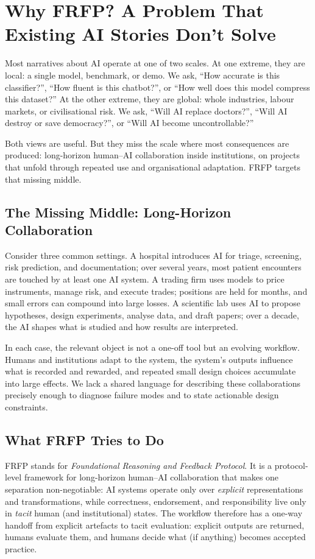 \chapter{Why FRFP? A Problem That Existing AI Stories Don't Solve}
\label{ch:plain-why-frfp}
Most narratives about AI operate at one of two scales. At one extreme, they are local: a single model, benchmark, or demo. We ask, ``How accurate is this classifier?'', ``How fluent is this chatbot?'', or ``How well does this model compress this dataset?'' At the other extreme, they are global: whole industries, labour markets, or civilisational risk. We ask, ``Will AI replace doctors?'', ``Will AI destroy or save democracy?'', or ``Will AI become uncontrollable?''

Both views are useful. But they miss the scale where most consequences are produced: long-horizon human--AI collaboration inside institutions, on projects that unfold through repeated use and organisational adaptation. FRFP targets that missing middle.

\section{The Missing Middle: Long-Horizon Collaboration}

Consider three common settings. A hospital introduces AI for triage, screening, risk prediction, and documentation; over several years, most patient encounters are touched by at least one AI system. A trading firm uses models to price instruments, manage risk, and execute trades; positions are held for months, and small errors can compound into large losses. A scientific lab uses AI to propose hypotheses, design experiments, analyse data, and draft papers; over a decade, the AI shapes what is studied and how results are interpreted.

In each case, the relevant object is not a one-off tool but an evolving workflow. Humans and institutions adapt to the system, the system’s outputs influence what is recorded and rewarded, and repeated small design choices accumulate into large effects. We lack a shared language for describing these collaborations precisely enough to diagnose failure modes and to state actionable design constraints.

\section{What FRFP Tries to Do}

FRFP stands for \emph{Foundational Reasoning and Feedback Protocol}. It is a protocol-level framework for long-horizon human--AI collaboration that makes one separation non-negotiable: AI systems operate only over \emph{explicit} representations and transformations, while correctness, endorsement, and responsibility live only in \emph{tacit} human (and institutional) states. The workflow therefore has a one-way handoff from explicit artefacts to tacit evaluation: explicit outputs are returned, humans evaluate them, and humans decide what (if anything) becomes accepted practice.

